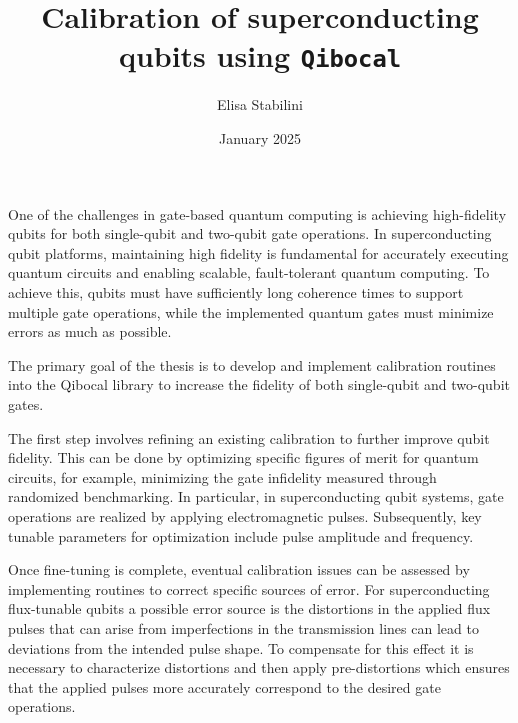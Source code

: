 \documentclass{article}
\title{Calibration of superconducting qubits using \tt{Qibocal}}
\author{Elisa Stabilini}
\date{January 2025}
\begin{document}
One of the challenges in gate-based quantum computing is achieving high-fidelity qubits for both single-qubit and two-qubit gate operations. In superconducting qubit platforms, maintaining high fidelity is fundamental for accurately executing quantum circuits and enabling scalable, fault-tolerant quantum computing. To achieve this, qubits must have sufficiently long coherence times to support multiple gate operations, while the implemented quantum gates must minimize errors as much as possible.

The primary goal of the thesis is to develop and implement calibration routines into the Qibocal library to increase the fidelity of both single-qubit and two-qubit gates. 

The first step involves refining an existing calibration to further improve qubit fidelity. 
This can be done by optimizing specific figures of merit for quantum circuits, for example, minimizing the gate infidelity measured through randomized benchmarking. 
In particular, in superconducting qubit systems, gate operations are realized by applying electromagnetic pulses. Subsequently, key tunable parameters for optimization include pulse amplitude and frequency. 

Once fine-tuning is complete, eventual calibration issues can be assessed by implementing routines to correct specific sources of error. For superconducting flux-tunable qubits a possible error source is the distortions in the applied flux pulses that can arise from imperfections in the transmission lines can lead to deviations from the intended pulse shape. To compensate for this effect it is necessary to characterize distortions and then apply pre-distortions which ensures that the applied pulses more accurately correspond to the desired gate operations.
\end{document}
